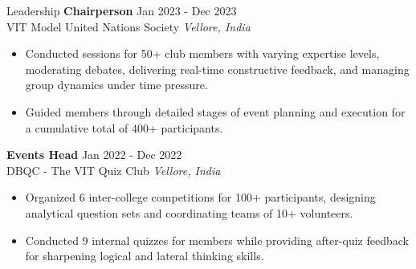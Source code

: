 \documentclass{resume} %
\begin{document}

\begin{rSection}{Leadership} 
\textbf{Chairperson} \hfill Jan 2023 - Dec 2023\\
VIT Model United Nations Society \hfill \textit{Vellore, India}
 \begin{itemize}
    \itemsep -3pt {} 
     \item Conducted sessions for 50+ club members with varying expertise levels, moderating debates, delivering real-time constructive feedback, and managing group dynamics under time pressure.
     \item Guided members through detailed stages of event planning and execution for a cumulative total of 400+ participants.
 \end{itemize}

 \textbf{Events Head} \hfill Jan 2022 - Dec 2022\\
DBQC - The VIT Quiz Club \hfill \textit{Vellore, India}
 \begin{itemize}
    \itemsep -3pt {} 
     \item Organized 6 inter-college competitions for 100+ participants, designing analytical question sets and coordinating teams of 10+ volunteers.
     \item Conducted 9 internal quizzes for members while providing after-quiz feedback for sharpening logical and lateral thinking skills.
 \end{itemize}


\end{rSection}
\end{document}
